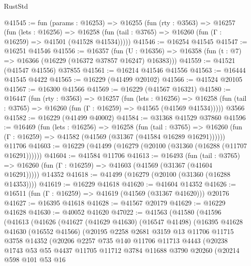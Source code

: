 \begin{lexlean}{RustStd}
\begin{coremodule}
@41545 := fun (params : @16253) =>
  @16255
    (fun (rty : @3563) =>
    @16257
      (fun (lets : @16256) =>
      @16258 (fun (tail : @3765) => @16260 (fun (Γ : @16259) => @41501 (@41528 @41534)))))
@41546 := @16254 @41545
@41547 := @16251 @41546
@41556 := @16357
    (fun (U : @16356) => @16358 (fun (t : @7) => @16366 (@16229 (@16372 @37857 @16247) @16383)))
@41559 := @41521 (@41547 @41556) @37855
@41561 := @16214 @41546 @41556
@41563 := @16444 @41545 @4422
@41565 := @16229 (@41499 @20102)
@41566 := @41524 @20105
@41567 := @16300 @41566
@41569 := @16229 (@41567 @16321)
@41580 := @16447
    (fun (rty : @3563) =>
    @16257
      (fun (lets : @16256) =>
      @16258 (fun (tail : @3765) => @16260 (fun (Γ : @16259) => @41565 (@41569 @41534)))))
    @3566
@41582 := @16229 (@41499 @40002)
@41584 := @31368 @41529 @37860
@41596 := @16469
    (fun (lets : @16256) =>
    @16258
      (fun (tail : @3765) =>
      @16260 (fun (Γ : @16259) => @41582 (@41569 (@31367 (@41584 @16289 @16291))))))
    @11706
@41603 := @16229 (@41499 (@16279 (@20100 (@31360 (@16288 (@11707 @16291))))))
@41604 := @41584 @11706
@41613 := @16493
    (fun (tail : @3765) => @16260 (fun (Γ : @16259) => @41603 (@41569 (@31367 (@41604 @16291)))))
    @14352
@41618 := @41499 (@16279 (@20100 (@31360 (@16288 @14353))))
@41619 := @16229 @41618
@41620 := @41604 @14352
@41626 := @16511 (fun (Γ : @16259) => @41619 (@41569 (@31367 @41620))) @20176
@41627 := @16395 @41618
@41628 := @41567 @20179
@41629 := @16229 @41628
@41630 := @40052 @41620
@47022 := @41563
    (@41580
      (@41596
        (@41613
          (@41626
            (@41627
              (@41629 @41630)
              (@16547 @41498)
              (@16395
                @41628
                @41630
                (@16552 @41566)
                (@20195
                  @2258
                  @2681
                  @3159
                  @13
                  @11706
                  @11715
                  @3758
                  @14352
                  (@20206
                    @2257
                    @735
                    @140
                    @11706
                    @11713
                    @4443
                    (@20238
                      @1743
                      @53
                      @55
                      @4437
                      @11705
                      @11712
                      @3784
                      @11688
                      @3790
                      @20260
                      (@20214
                        @598
                        @101
                        @53
                        @16

\end{coremodule}
\end{lexlean}
